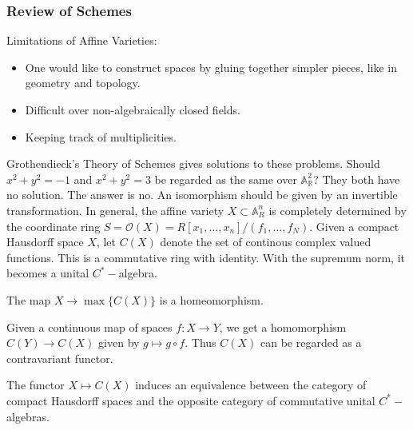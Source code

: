             \subsubsection{Review of Schemes}
                Limitations of Affine Varieties:
                \begin{itemize}
                    \item   One would like to construct spaces by gluing
                            together simpler pieces, like in geometry and
                            topology.
                    \item Difficult over non-algebraically
                          closed fields.
                    \item Keeping track of multiplicities.
                \end{itemize}
                Grothendieck's Theory of Schemes gives solutions to
                these problems. Should $x^{2}+y^{2}=-1$ and
                $x^{2}+y^{2}=3$ be regarded as the same over
                $\mathbb{A}_{\mathbb{R}}^{2}$? They both have no
                solution. The answer is no. An isomorphism should
                be given by an invertible transformation. In general,
                the affine variety $X\subset\mathbb{A}_{R}^n$ is
                completely determined by the coordinate ring
                $S=\mathcal{O}(X)%
                  =R[x_{1},\hdots,x_{n}]/(f_{1},\hdots,f_{N})$.
                Given a compact Hausdorff space $X$, let $C(X)$
                denote the set of continous complex valued functions.
                This is a commutative ring with identity. With the
                supremum norm, it becomes a unital $C^{*}-$algebra.
                \begin{theorem}
                    The map $X\rightarrow\max\{C(X)\}$
                    is a homeomorphism.
                \end{theorem}
                Given a continuous map of spaces $f:X\rightarrow Y$,
                we get a homomorphism $C(Y)\rightarrow C(X)$ given
                by $g\mapsto{g}\circ f$. Thus $C(X)$ can be
                regarded as a contravariant functor. 
                \begin{theorem}[Gelfand]
                    The functor $X\mapsto C(X)$ induces an
                    equivalence between the category of compact
                    Hausdorff spaces and the opposite category of
                    commutative unital $C^{*}-$algebras.
                \end{theorem}
